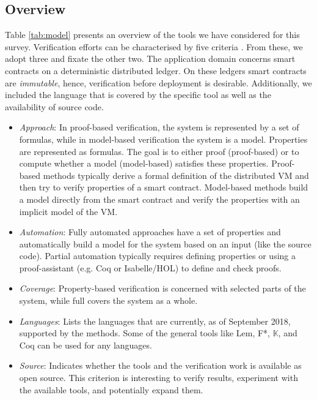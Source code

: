 \subsection{Overview}

Table \ref{tab:model} presents an overview of the tools we have considered for this survey.
Verification efforts can be characterised by five criteria \cite[173]{Huth2004}. From these, we adopt three and fixate the other two. 
The application domain concerns smart contracts on a deterministic distributed ledger.
On these ledgers smart contracts are \emph{immutable}, hence, verification before deployment is desirable. 
Additionally, we included the language that is covered by the specific tool as well as the availability of source code.

\begin{itemize}
\item \emph{Approach}: In proof-based verification, the system is represented by a set of formulas, while in model-based verification the system is a model. Properties are represented as formulas. The goal is to either proof (proof-based) or to compute whether a model (model-based) satisfies these properties. Proof-based methods typically derive a formal definition of the distributed VM and then try to verify properties of a smart contract. Model-based methods build a model directly from the smart contract and verify the properties with an implicit model of the VM.
\item \emph{Automation}: Fully automated approaches have a set of properties and automatically build a model for the system based on an input (like the source code). Partial automation typically requires defining properties or using a proof-assistant (e.g. Coq or Isabelle/HOL) to define and check proofs.
\item \emph{Coverage}: Property-based verification is concerned with selected parts of the system, while full covers the system as a whole.
\item \emph{Languages}: Lists the languages that are currently, as of September 2018, supported by the methods. Some of the general tools like Lem, F*, $\mathbb{K}$, and Coq can be used for any languages.
\item \emph{Source}: Indicates whether the tools and the verification work is available as open source. This criterion is interesting to verify results, experiment with the available tools, and potentially expand them.
\end{itemize}

